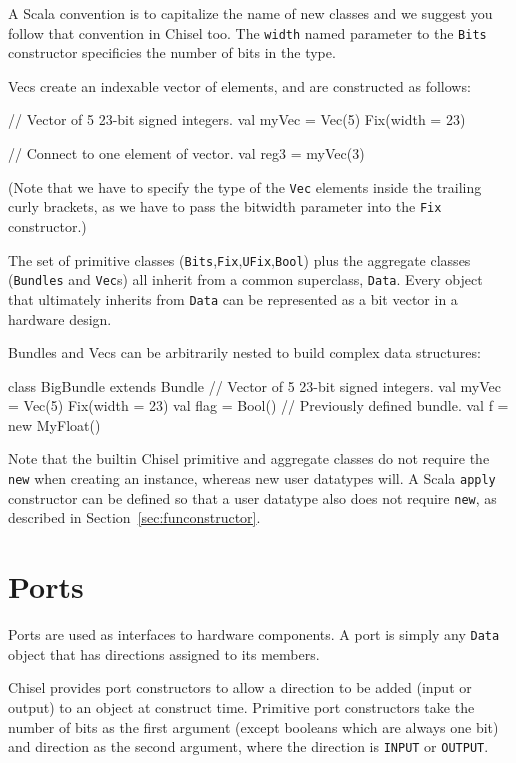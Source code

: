 \documentclass[twocolumn,10pt]{article}
\def\code#1{{\tt #1}}
\begin{document}
\noindent
A Scala convention is to capitalize the name of new classes and we
suggest you follow that convention in Chisel too.  The \code{width}
named parameter to the \code{Bits} constructor specificies the number
of bits in the type.

Vecs create an indexable vector of elements, and are constructed as
follows:
\begin{scala}
// Vector of 5 23-bit signed integers.
val myVec = Vec(5) { Fix(width = 23) } 

// Connect to one element of vector. 
val reg3  = myVec(3) 
\end{scala}

\noindent
(Note that we have to specify the type of the \code{Vec} elements
inside the trailing curly brackets, as we have to pass the bitwidth
parameter into the \code{Fix} constructor.)

The set of primitive classes
(\code{Bits},\code{Fix},\code{UFix},\code{Bool}) plus the aggregate
classes (\code{Bundles} and \code{Vec}s) all inherit from a common
superclass, \code{Data}.  Every object that ultimately inherits from
\code{Data} can be represented as a bit vector in a hardware design.

Bundles and Vecs can be arbitrarily nested to build complex data
structures:
\begin{scala}
class BigBundle extends Bundle {
 // Vector of 5 23-bit signed integers.
 val myVec = Vec(5) { Fix(width = 23) } 
 val flag  = Bool()
 // Previously defined bundle.
 val f     = new MyFloat()              
}
\end{scala}

\noindent
Note that the builtin Chisel primitive and aggregate classes do not
require the \code{new} when creating an instance, whereas new user
datatypes will.  A Scala \code{apply} constructor can be defined so
that a user datatype also does not require \code{new}, as described in
Section~\ref{sec:funconstructor}.

\section{Ports}

Ports are used as interfaces to hardware components.  A port is simply
any \code{Data} object that has directions assigned to its members.

Chisel provides port constructors to allow a direction to be added
(input or output) to an object at construct time.  Primitive port
constructors take the number of bits as the first argument (except
booleans which are always one bit) and direction as the second
argument, where the direction is \code{INPUT} or
\code{OUTPUT}.
\end{document}
